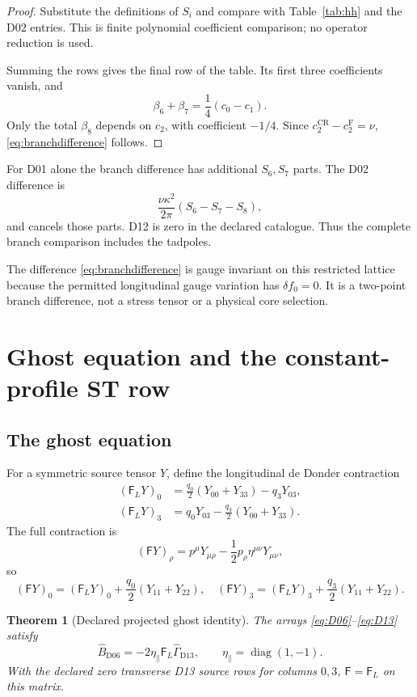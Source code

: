 \documentclass[11pt,a4paper]{article}
\newcommand{\ka}{\kappa}
\newcommand{\Fr}{\mathrm F}
\newcommand{\CR}{\mathrm{CR}}
\newcommand{\diag}{\operatorname{diag}}
\theoremstyle{plain}
\newtheorem{theorem}{Theorem}[section]
\theoremstyle{definition}
\theoremstyle{remark}
\numberwithin{equation}{section}
\begin{document}
\begin{proof}
Substitute the definitions of \(S_i\) and compare with
Table~\ref{tab:hh} and the D02 entries. This is finite polynomial
coefficient comparison; no operator reduction is used.

Summing the rows gives the final row of the table.
Its first three coefficients vanish, and
\[
 \beta_6+\beta_7=\frac14(c_0-c_1).
\]
Only the total \(\beta_8\) depends on \(c_2\), with coefficient
\(-1/4\). Since \(c_2^\CR-c_2^\Fr=\nu\),
\eqref{eq:branchdifference} follows.
\end{proof}

For D01 alone the branch difference has additional \(S_6,S_7\)
parts. The D02 difference is
\[
 \frac{\nu\ka^2}{2\pi}(S_6-S_7-S_8),
\]
and cancels those parts. D12 is zero in the declared catalogue.
Thus the complete branch comparison includes the tadpoles.

The difference \eqref{eq:branchdifference} is gauge invariant on
this restricted lattice because the permitted longitudinal gauge
variation has \(\delta f_0=0\). It is a two-point branch
difference, not a stress tensor or a physical core selection.

\section{Ghost equation and the constant-profile ST row}
\label{sec:ST}

\subsection{The ghost equation}

For a symmetric source tensor \(Y\), define the longitudinal
de Donder contraction
\begin{align}
 (\mathsf F_LY)_0&=
 \frac{q_0}{2}(Y_{00}+Y_{33})-q_3Y_{03},\nonumber\\
 (\mathsf F_LY)_3&=
 q_0Y_{03}-\frac{q_3}{2}(Y_{00}+Y_{33}).
 \label{eq:FL}
\end{align}
The full contraction is
\[
 (\mathsf FY)_\rho
 =p^\mu Y_{\mu\rho}
  -\frac12p_\rho\eta^{\mu\nu}Y_{\mu\nu},
\]
so
\[
 (\mathsf FY)_0=(\mathsf F_LY)_0
       +\frac{q_0}{2}(Y_{11}+Y_{22}),
 \quad
 (\mathsf FY)_3=(\mathsf F_LY)_3
       +\frac{q_3}{2}(Y_{11}+Y_{22}).
\]

\begin{theorem}[Declared projected ghost identity]
\label{thm:ghost}
The arrays \eqref{eq:D06}--\eqref{eq:D13} satisfy
\begin{equation}
 \widehat B_{\mathrm{D06}}
 =-2\eta_\parallel\mathsf F_L
       \widehat\Gamma_{\mathrm{D13}},
 \qquad \eta_\parallel=\diag(1,-1).
 \label{eq:ghostidentity}
\end{equation}
With the declared zero transverse D13 source rows for columns
\(0,3\), \(\mathsf F=\mathsf F_L\) on this matrix.
\end{theorem}
\end{document}
